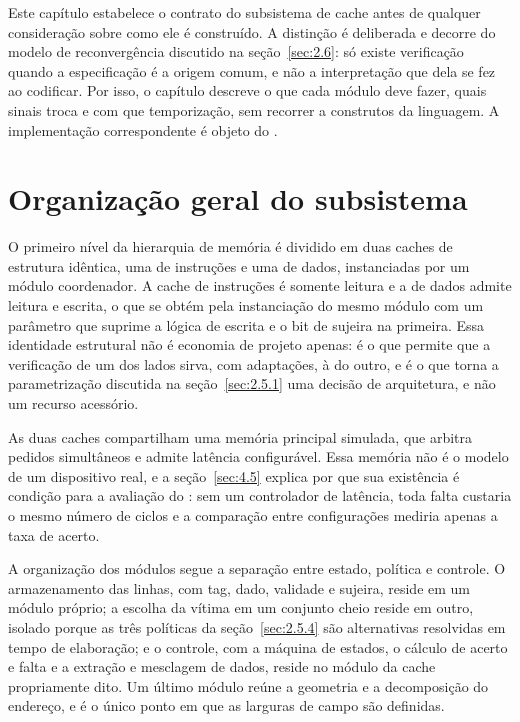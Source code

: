 Este capítulo estabelece o contrato do subsistema de cache antes de qualquer consideração sobre como ele é construído. A distinção é deliberada e decorre do modelo de reconvergência discutido na seção~\ref{sec:2.6}: só existe verificação quando a especificação é a origem comum, e não a interpretação que dela se fez ao codificar. Por isso, o capítulo descreve o que cada módulo deve fazer, quais sinais troca e com que temporização, sem recorrer a construtos da linguagem. A implementação correspondente é objeto do .

\section{Organização geral do subsistema}\label{sec:4.1}

O primeiro nível da hierarquia de memória é dividido em duas caches de estrutura idêntica, uma de instruções e uma de dados, instanciadas por um módulo coordenador. A cache de instruções é somente leitura e a de dados admite leitura e escrita, o que se obtém pela instanciação do mesmo módulo com um parâmetro que suprime a lógica de escrita e o bit de sujeira na primeira. Essa identidade estrutural não é economia de projeto apenas: é o que permite que a verificação de um dos lados sirva, com adaptações, à do outro, e é o que torna a parametrização discutida na seção~\ref{sec:2.5.1} uma decisão de arquitetura, e não um recurso acessório.

As duas caches compartilham uma memória principal simulada, que arbitra pedidos simultâneos e admite latência configurável. Essa memória não é o modelo de um dispositivo real, e a seção~\ref{sec:4.5} explica por que sua existência é condição para a avaliação do : sem um controlador de latência, toda falta custaria o mesmo número de ciclos e a comparação entre configurações mediria apenas a taxa de acerto.

A organização dos módulos segue a separação entre estado, política e controle. O armazenamento das linhas, com tag, dado, validade e sujeira, reside em um módulo próprio; a escolha da vítima em um conjunto cheio reside em outro, isolado porque as três políticas da seção~\ref{sec:2.5.4} são alternativas resolvidas em tempo de elaboração; e o controle, com a máquina de estados, o cálculo de acerto e falta e a extração e mesclagem de dados, reside no módulo da cache propriamente dito. Um último módulo reúne a geometria e a decomposição do endereço, e é o único ponto em que as larguras de campo são definidas.

